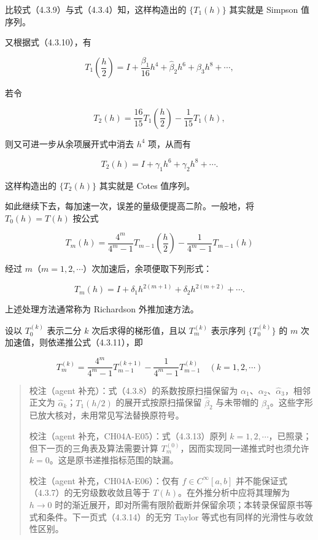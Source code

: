 比较式（4.3.9）与式（4.3.4）知，这样构造出的 \(\{T_1(h)\}\) 其实就是 Simpson 值序列。

又根据式（4.3.10），有

\[
T_1\left(\frac h2\right)=I+\frac{\beta_1}{16}h^4+\hat\beta_2h^6+\beta_3h^8+\cdots,
\]

若令

\[
T_2(h)=\frac{16}{15}T_1\left(\frac h2\right)-\frac1{15}T_1(h),
\]

则又可进一步从余项展开式中消去 \(h^4\) 项，从而有

\[
T_2(h)=I+\gamma_1h^6+\gamma_2h^8+\cdots.
\]

这样构造出的 \(\{T_2(h)\}\) 其实就是 Cotes 值序列。

如此继续下去，每加速一次，误差的量级便提高二阶。一般地，将 \(T_0(h)=T(h)\) 按公式

\[
T_m(h)=\frac{4^m}{4^m-1}T_{m-1}\left(\frac h2\right)-\frac1{4^m-1}T_{m-1}(h)
\tag{4.3.11}
\]

经过 \(m\)（\(m=1,2,\cdots\)）次加速后，余项便取下列形式：

\[
T_m(h)=I+\delta_1h^{2(m+1)}+\delta_2h^{2(m+2)}+\cdots.
\tag{4.3.12}
\]

上述处理方法通常称为 Richardson 外推加速方法。

设以 \(T_0^{(k)}\) 表示二分 \(k\) 次后求得的梯形值，且以 \(T_m^{(k)}\) 表示序列 \(\{T_0^{(k)}\}\) 的 \(m\) 次加速值，则依递推公式（4.3.11），即

\[
T_m^{(k)}=\frac{4^m}{4^m-1}T_{m-1}^{(k+1)}-\frac1{4^m-1}T_{m-1}^{(k)}\quad(k=1,2,\cdots)
\tag{4.3.13}
\]

\begin{quote}
校注（agent 补充）：式（4.3.8）的系数按原扫描保留为 \(\alpha_1\)、\(\alpha_2\)、\(\hat\alpha_3\)，相邻正文为 \(\hat\alpha_k\)；\(T_1(h/2)\) 的展开式按原扫描保留 \(\hat\beta_2\) 与未带帽的 \(\beta_3\)。这些字形已放大核对，未用常见写法替换原符号。

校注（agent 补充，CH04A-E05）：式（4.3.13）原列 \(k=1,2,\cdots\)，已照录；但下一页的三角表及算法需要计算 \(T_m^{(0)}\)，因而实现同一递推式时也须允许 \(k=0\)。这是原书递推指标范围的缺漏。

校注（agent 补充，CH04A-E06）：仅有 \(f\in C^\infty[a,b]\) 并不能保证式（4.3.7）的无穷级数收敛且等于 \(T(h)\)。在外推分析中应将其理解为 \(h\to0\) 时的渐近展开，即对所需有限阶截断并保留余项；本转录保留原书等式和条件。下一页式（4.3.14）的无穷 Taylor 等式也有同样的光滑性与收敛性区别。
\end{quote}

\clearpage


